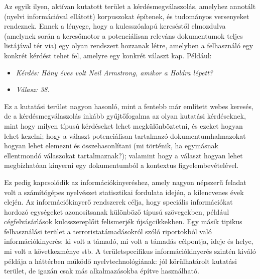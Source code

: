 \begin{multicols}{2}

Az egyik ilyen, aktívan kutatott terület a kérdésmegválaszolás, amelyhez annotált (nyelvi információval ellátott) korpuszokat építenek, és tudományos versenyeket rendeznek. Ennek a lényege, hogy a kulcsszóalapú kereséstől elmozdulva (amelynek során a keresőmotor a potenciálisan releváns dokumentumok teljes listájával tér via) egy olyan rendszert hozzanak létre, amelyben a felhasználó egy konkrét kérdést tehet fel, amelyre egy konkrét választ kap. Például:
  
\begin{itemize}
  \item[] \textit{Kérdés: Hány éves volt Neil Armstrong, amikor a Holdra lépett?}
  \item[] \textit{Válasz: 38.}
\end{itemize}

Ez a kutatási terület nagyon hasonló, mint a fentebb már említett webes keresés, de a kérdésmegválaszolás inkább gyűjtőfogalma az olyan kutatási kérdéseknek, mint hogy milyen típusú kérdéseket lehet megkülönböztetni, és ezeket hogyan lehet kezelni; hogy a választ potenciálisan tartalmazó dokumentumhalmazokat hogyan lehet elemezni és összehasonlítani (mi történik, ha egymásnak ellentmondó vá\-la\-szo\-kat tartalmaznak?); valamint hogy a választ hogyan lehet megbízhatóan ki\-nyer\-ni egy dokumentumból a kontextus figyelembevételével. 

Ez pedig kapcsolódik az in\-for\-má\-ció\-ki\-nye\-rés\-hez, amely nagyon népszerű feladat volt a számítógépes nyelvészet statisztikai fordulata idején, a kilencvenes évek elején. Az információkinyerő rendszerek célja, hogy speciális információkat hordozó egységeket azonosítsanak különböző típusú szövegekben, például cégfelvásárlások kulcsszereplőit felismerjék újságcikkekben. Egy másik tipikus felhasználási terület a terroristatámadásokról szóló riportokból való információkinyerés: ki volt a támadó, mi volt a támadás célpontja, ideje és helye, mi volt a következménye stb. A területspecifikus in\-for\-má\-ció\-ki\-nye\-rés szintén kiváló példája a háttérben működő nyelvtechnológiának: jól körülhatárolt kutatási terület, de igazán csak más alkalmazásokba építve használható.  


\end{multicols}
